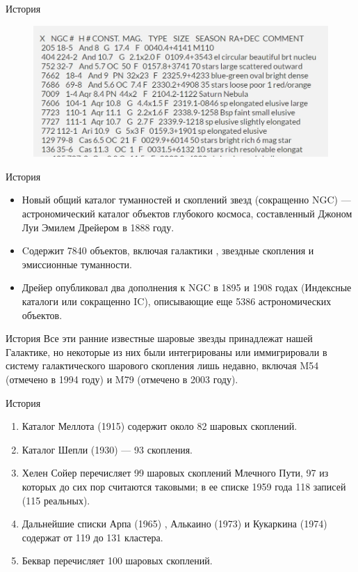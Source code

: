 \documentclass{beamer}
\begin{document}
    \begin{frame}{История}
        \begin{figure}[h]
            \centering
            \includegraphics[width=0.9\linewidth]{pictures/NGC.jpg}
        \end{figure}
    \end{frame}
    \begin{frame}{История}
        \begin{itemize}[]
            \item Новый общий каталог туманностей и скоплений звезд (сокращенно NGC) --- астрономический каталог объектов глубокого космоса, 
                составленный Джоном Луи Эмилем Дрейером в 1888 году.
            \item Cодержит 7840 объектов, включая галактики , звездные скопления и эмиссионные туманности.
            \item  Дрейер опубликовал два дополнения к NGC в 1895 и 1908 годах (Индексные каталоги или сокращенно IC), 
                описывающие еще 5386 астрономических объектов.
        \end{itemize}
    \end{frame}
    \begin{frame}{История}
        Все эти ранние известные шаровые звезды принадлежат нашей Галактике, 
        но некоторые из них были интегрированы или иммигрировали в систему галактического шарового скопления лишь недавно, 
        включая M54 (отмечено в 1994 году) и M79 (отмечено в 2003 году).
    \end{frame}
    \begin{frame}{История}
        \begin{enumerate}[]
            \item Каталог Меллота (1915)\cite{Mellot1915} содержит около 82 шаровых скоплений.
            \item Каталог Шепли (1930)\cite{Shapley1930} --- 93 скопления.
            \item Хелен Сойер\cite{Hogg1947} перечисляет 99 шаровых скоплений Млечного Пути, 97 из которых до сих пор считаются таковыми; в ее списке 1959 года\cite{Hogg1959} 118 записей (115 реальных).
            \item Дальнейшие списки Арпа (1965) , Алькаино (1973) и Кукаркина (1974) содержат от 119 до 131 кластера.
            \item Беквар перечисляет 100 шаровых скоплений.
        \end{enumerate}
    \end{frame}
\end{document}
